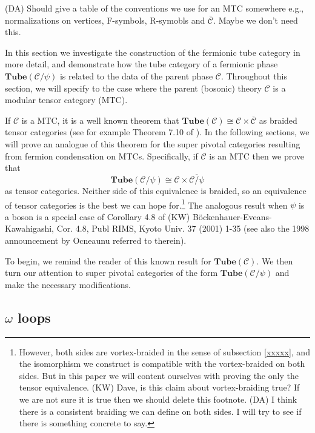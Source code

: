 \documentclass[12pt,a4paper]{article}
\newcommand{\mcc}{\mathcal{C}}
\newcommand\be            {\begin{equation}}
\newcommand\ee            {\end{equation}}
\newcommand{\tube}{\textbf{Tube}}
\newcommand{\kw}[1]{{\color{kwcolor}\footnotesize{(KW) #1}}}
\newcommand{\dave}[1]{{\color{ao(english)}\footnotesize{(DA) #1}}}
\begin{document}
\dave{Should give a table of the conventions we use for an MTC somewhere
e.g., normalizations on vertices, F-symbols, R-symobls and $\bar{\mcc}$.
Maybe we don't need this.}

In this section we investigate the construction of the fermionic tube category in more detail, 
and demonstrate how the tube category of a fermionic phase $\tube(\mcc / \psi)$ is related to 
the data of the parent phase $\mcc$. 
Throughout this section, we will specify to the case where the parent (bosonic) theory $\mcc$
is a modular tensor category (MTC).

If $\mcc$ is a MTC, it is a well known theorem that $\tube(\mcc) \cong \mcc \times \overline{\mcc}$ as braided tensor categories
(see for example Theorem 7.10 of \cite{muger2003b}). 
In the following sections, we will prove an analogue of this theorem for the super pivotal categories resulting from fermion condensation on MTCs.
Specifically, if $\mcc$ is an MTC then we prove that 
\be \label{tube_theorem_teaser}
	\tube(\mcc/\psi) \cong \mcc \times \overline{\mcc/\psi}
\ee 
as tensor categories.
Neither side of this equivalence is braided, so an equivalence of tensor categories is the best we can hope for.\footnote{However, 
both sides are vortex-braided in the sense of subsection \ref{xxxxx}, and the isomorphism we construct
is compatible with the vortex-braided on both sides.
But in this paper we will content ourselves with proving the only the tensor equivalence.
\kw{Dave, is this claim about vortex-braiding true?
If we are not sure it is true then we should delete this footnote.}
\dave{I think there is a consistent braiding we can define on both sides.
I will try to see if there is something concrete to say.}
}
The analogous result when $\psi$ is a boson is a special case of Corollary 4.8 of \cite{kawahigashi2001}
\kw{B\"ockenhauer-Eveans-Kawahigashi, Cor. 4.8, Publ RIMS, Kyoto Univ. 37 (2001) 1-35}
(see also the 1998 announcement by Ocneaunu referred to therein).

To begin, we remind the reader of this known result for $\tube(\mcc)$.
We then turn our attention to super pivotal categories of the form $\tube(\mcc/\psi)$ and make the necessary modifications.

\subsection{$\omega$ loops}
\end{document}
